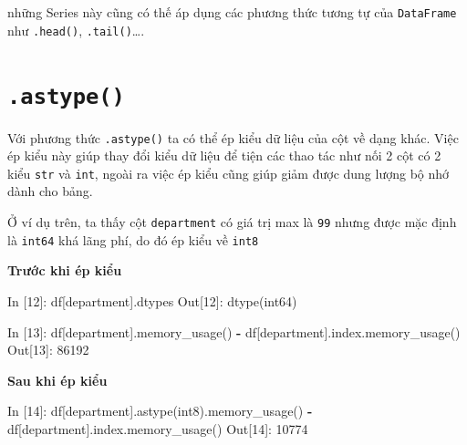 \documentclass[
]{book}
\newenvironment{Shaded}{\begin{snugshade}}{\end{snugshade}}
\newcommand{\DecValTok}[1]{\textcolor[rgb]{0.00,0.00,0.81}{#1}}
\newcommand{\NormalTok}[1]{#1}
\newcommand{\OperatorTok}[1]{\textcolor[rgb]{0.81,0.36,0.00}{\textbf{#1}}}
\newcommand{\StringTok}[1]{\textcolor[rgb]{0.31,0.60,0.02}{#1}}
\begin{document}
những Series này cũng có thế áp dụng các phương thức tương tự của \texttt{DataFrame} như \texttt{.head()}, \texttt{.tail()}\ldots.

\hypertarget{astype}{%
\section{\texorpdfstring{\texttt{.astype()}}{.astype()}}\label{astype}}

Với phương thức \texttt{.astype()} ta có thể ép kiểu dữ liệu của cột về dạng khác. Việc ép kiểu này giúp thay đổi kiểu dữ liệu để tiện các thao tác như nối 2 cột có 2 kiểu \texttt{str} và \texttt{int}, ngoài ra việc ép kiểu cũng giúp giảm được dung lượng bộ nhớ dành cho bảng.

Ở ví dụ trên, ta thấy cột \texttt{department} có giá trị max là \texttt{99} nhưng được mặc định là \texttt{int64} khá lãng phí, do đó ép kiểu về \texttt{int8}

\textbf{Trước khi ép kiểu}

\begin{Shaded}
\begin{Highlighting}[]
\NormalTok{In [}\DecValTok{12}\NormalTok{]: df[}\StringTok{\textquotesingle{}department\textquotesingle{}}\NormalTok{].dtypes}
\NormalTok{Out[}\DecValTok{12}\NormalTok{]: dtype(}\StringTok{\textquotesingle{}int64\textquotesingle{}}\NormalTok{)}

\NormalTok{In [}\DecValTok{13}\NormalTok{]: df[}\StringTok{\textquotesingle{}department\textquotesingle{}}\NormalTok{].memory\_usage() }\OperatorTok{{-}}\NormalTok{ df[}\StringTok{\textquotesingle{}department\textquotesingle{}}\NormalTok{].index.memory\_usage()}
\NormalTok{Out[}\DecValTok{13}\NormalTok{]: }
\DecValTok{86192}
\end{Highlighting}
\end{Shaded}

\textbf{Sau khi ép kiểu}

\begin{Shaded}
\begin{Highlighting}[]
\NormalTok{In [}\DecValTok{14}\NormalTok{]: df[}\StringTok{\textquotesingle{}department\textquotesingle{}}\NormalTok{].astype(}\StringTok{\textquotesingle{}int8\textquotesingle{}}\NormalTok{).memory\_usage() }\OperatorTok{{-}}\NormalTok{ df[}\StringTok{\textquotesingle{}department\textquotesingle{}}\NormalTok{].index.memory\_usage()}
\NormalTok{Out[}\DecValTok{14}\NormalTok{]: }
\DecValTok{10774}
\end{Highlighting}
\end{Shaded}
\end{document}
